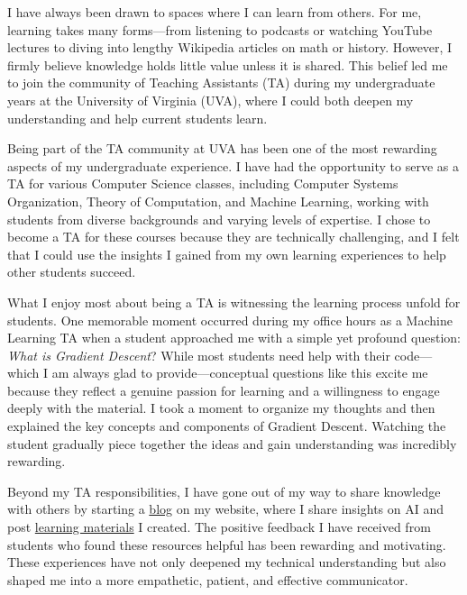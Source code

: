 \documentclass[10pt]{article}
\begin{document}
I have always been drawn to spaces where I can learn from others. For me, learning takes many forms—from listening to podcasts or watching YouTube lectures to diving into lengthy Wikipedia articles on math or history. However, I firmly believe knowledge holds little value unless it is shared. This belief led me to join the community of Teaching Assistants (TA) during my undergraduate years at the University of Virginia (UVA), where I could both deepen my understanding and help current students learn.

Being part of the TA community at UVA has been one of the most rewarding aspects of my undergraduate experience. I have had the opportunity to serve as a TA for various Computer Science classes, including Computer Systems Organization, Theory of Computation, and Machine Learning, working with students from diverse backgrounds and varying levels of expertise. I chose to become a TA for these courses because they are technically challenging, and I felt that I could use the insights I gained from my own learning experiences to help other students succeed.

What I enjoy most about being a TA is witnessing the learning process unfold for students. One memorable moment occurred during my office hours as a Machine Learning TA when a student approached me with a simple yet profound question: \textit{What is Gradient Descent}? While most students need help with their code—which I am always glad to provide—conceptual questions like this excite me because they reflect a genuine passion for learning and a willingness to engage deeply with the material. I took a moment to organize my thoughts and then explained the key concepts and components of Gradient Descent. Watching the student gradually piece together the ideas and gain understanding was incredibly rewarding.

Beyond my TA responsibilities, I have gone out of my way to share knowledge with others by starting a \href{https://www.brandonyifanyang.com/blog}{blog} on my website, where I share insights on AI and post \href{https://www.brandonyifanyang.com/notes}{learning materials} I created. The positive feedback I have received from students who found these resources helpful has been rewarding and motivating. These experiences have not only deepened my technical understanding but also shaped me into a more empathetic, patient, and effective communicator.
\end{document}
